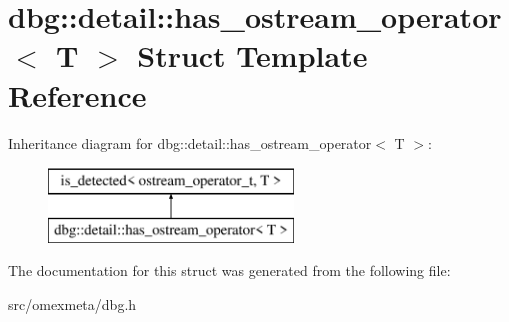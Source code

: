 \hypertarget{structdbg_1_1detail_1_1has__ostream__operator}{}\section{dbg\+:\+:detail\+:\+:has\+\_\+ostream\+\_\+operator$<$ T $>$ Struct Template Reference}
\label{structdbg_1_1detail_1_1has__ostream__operator}
Inheritance diagram for dbg\+:\+:detail\+:\+:has\+\_\+ostream\+\_\+operator$<$ T $>$\+:\begin{figure}[H]
\begin{center}
\leavevmode
\includegraphics[height=2.000000cm]{structdbg_1_1detail_1_1has__ostream__operator}
\end{center}
\end{figure}


The documentation for this struct was generated from the following file\+:\begin{DoxyCompactItemize}
\item 
src/omexmeta/dbg.\+h\end{DoxyCompactItemize}
